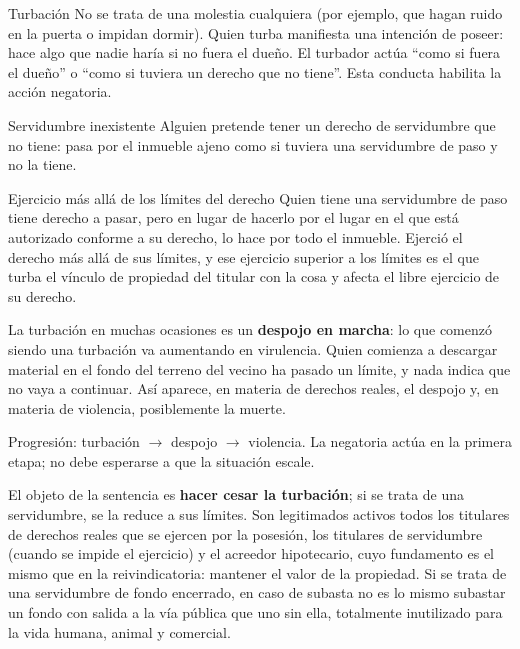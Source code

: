 \documentclass[12pt,oneside]{book}
\begin{document}
\begin{definicion}{Turbación}
No se trata de una molestia cualquiera (por ejemplo, que hagan ruido en la puerta o impidan dormir). Quien turba manifiesta una intención de poseer: hace algo que nadie haría si no fuera el dueño. El turbador actúa ``como si fuera el dueño'' o ``como si tuviera un derecho que no tiene''. Esta conducta habilita la acción negatoria.
\end{definicion}

\begin{ejemplo}{Servidumbre inexistente}
Alguien pretende tener un derecho de servidumbre que no tiene: pasa por el inmueble ajeno como si tuviera una servidumbre de paso y no la tiene.
\end{ejemplo}

\begin{ejemplo}{Ejercicio más allá de los límites del derecho}
Quien tiene una servidumbre de paso tiene derecho a pasar, pero en lugar de hacerlo por el lugar en el que está autorizado conforme a su derecho, lo hace por todo el inmueble. Ejerció el derecho más allá de sus límites, y ese ejercicio superior a los límites es el que turba el vínculo de propiedad del titular con la cosa y afecta el libre ejercicio de su derecho.
\end{ejemplo}

La turbación en muchas ocasiones es un \textbf{despojo en marcha}: lo que comenzó siendo una turbación va aumentando en virulencia. Quien comienza a descargar material en el fondo del terreno del vecino ha pasado un límite, y nada indica que no vaya a continuar. Así aparece, en materia de derechos reales, el despojo y, en materia de violencia, posiblemente la muerte.

\begin{importante}
Progresión: turbación $\rightarrow$ despojo $\rightarrow$ violencia. La negatoria actúa en la primera etapa; no debe esperarse a que la situación escale.
\end{importante}

El objeto de la sentencia es \textbf{hacer cesar la turbación}; si se trata de una servidumbre, se la reduce a sus límites. Son legitimados activos todos los titulares de derechos reales que se ejercen por la posesión, los titulares de servidumbre (cuando se impide el ejercicio) y el acreedor hipotecario, cuyo fundamento es el mismo que en la reivindicatoria: mantener el valor de la propiedad. Si se trata de una servidumbre de fondo encerrado, en caso de subasta no es lo mismo subastar un fondo con salida a la vía pública que uno sin ella, totalmente inutilizado para la vida humana, animal y comercial.
\end{document}
